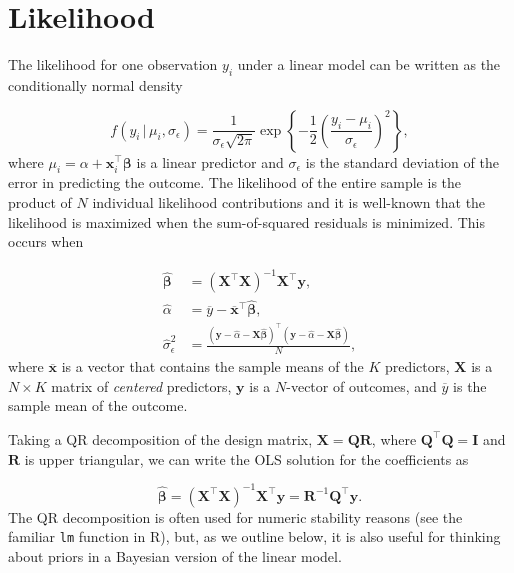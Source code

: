 \documentclass[11pt]{article}
\begin{document}
\section{Likelihood}

The likelihood for one observation $y_i$ under a linear model can be written as
the conditionally normal density

$$
f(y_i \,|\, \mu_i, \sigma_\epsilon)
= \frac{1}{\sigma_{\epsilon} \sqrt{2 \pi}}
\exp{\left\{-\frac{1}{2} \left(\frac{y_i - \mu_i}{\sigma_{\epsilon}}\right)^2\right\}},
$$
%
where $\mu_i = \alpha + \mathbf{x}_i^\top \boldsymbol{\beta}$ is a linear
predictor and $\sigma_{\epsilon}$ is the standard deviation of the error in
predicting the outcome. The likelihood of the entire sample is the product of
$N$ individual likelihood contributions and it is well-known that the likelihood
is maximized when the sum-of-squared residuals is minimized. This occurs when

\begin{align*}
\widehat{\boldsymbol{\beta}}
  &= \left(\mathbf{X}^\top \mathbf{X}\right)^{-1} \mathbf{X}^\top \mathbf{y},\\
\widehat{\alpha}
  &= \overline{y} - \overline{\mathbf{x}}^\top \widehat{\boldsymbol{\beta}},\\
\widehat{\sigma}_{\epsilon}^2
  &= \frac{\left(\mathbf{y} - \widehat{\alpha} -
        \mathbf{X} \widehat{\boldsymbol{\beta}}\right)^\top
        \left(\mathbf{y} - \widehat{\alpha} -
        \mathbf{X} \widehat{\boldsymbol{\beta}}\right)}{N},
\end{align*}
%
where $\overline{\mathbf{x}}$ is a vector that contains the sample means of the
$K$ predictors, $\mathbf{X}$ is a $N \times K$ matrix of \emph{centered}
predictors, $\mathbf{y}$ is a $N$-vector of outcomes, and $\overline{y}$ is the
sample mean of the outcome.

Taking a QR decomposition of the design matrix,
$\mathbf{X} = \mathbf{Q}\mathbf{R}$,
where $\mathbf{Q}^\top \mathbf{Q} = \mathbf{I}$ and $\mathbf{R}$ is upper
triangular, we can write the OLS solution for the coefficients as

$$
\widehat{\boldsymbol{\beta}}
= \left(\mathbf{X}^\top \mathbf{X}\right)^{-1} \mathbf{X}^\top \mathbf{y}
= \mathbf{R}^{-1} \mathbf{Q}^\top \mathbf{y}.
$$
%
The QR decomposition is often used for numeric stability reasons (see the
familiar {\tt lm} function in R), but, as we outline below, it is also useful
for thinking about priors in a Bayesian version of the linear model.
\end{document}
